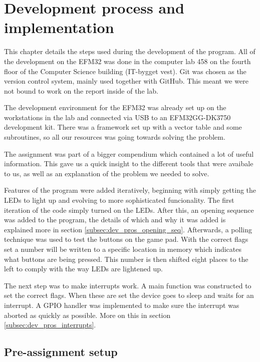 \section{Development process and implementation}
\label{chap:development_process}

This chapter details the steps used during the development of the program. All of the development on the EFM32 was done in the computer lab 458 on the fourth floor of the Computer Science building (IT-bygget vest). Git was chosen as the version control system, mainly used together with GitHub. This meant we were not bound to work on the report inside of the lab.

The development environment for the EFM32 was already set up on the workstations in the lab and connected via USB to an EFM32GG-DK3750 development kit. There was a framework set up with a vector table and some subroutines, so all our resources was going towards solving the problem.

The assignment was part of a bigger compendium \cite{eeds-compendium} which contained a lot of useful information. This gave us a quick insight to the different tools that were avaibale to us, as well as an explanation of the problem we needed to solve.

Features of the program were added iteratively, beginning with simply getting the LEDs to light up and evolving to more sophisticated funcionality. The first iteration of the code simply turned on the LEDs. After this, an opening sequence was added to the program, the details of which and why it was added is explained more in section \ref{subsec:dev_pros_opening_seq}. Afterwards, a polling technique was used to test the buttons on the game pad. With the correct flags set a number will be written to a specific location in memory which indicates what buttons are being pressed. This number is then shifted eight places to the left to comply with the way LEDs are lightened up.

The next step was to make interrupts work. A main function was constructed to set the correct flags. When these are set the device goes to sleep and waits for an interrupt. A GPIO handler was implemented to make sure the interrupt was aborted as quickly as possible. More on this in section \ref{subsec:dev_pros_interrupts}.

\subsection{Pre-assignment setup}
\label{subsec:pre-assingment_setup}


